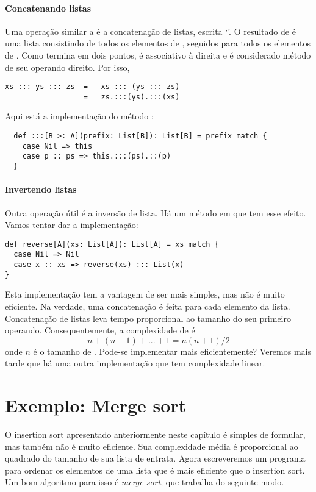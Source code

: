 \paragraph{Concatenando listas}
Uma operação similar a \code{::} é a concatenação de listas, escrita `\code{:::}'.
O resultado de  é uma lista consistindo de todos os elementos 
de , seguidos para todos os elementos de . Como termina em dois pontos, 
\code{:::} é associativo à direita e é considerado método de seu operando direito. Por isso,
\begin{lstlisting}
xs ::: ys ::: zs  =   xs ::: (ys ::: zs)
                  =   zs.:::(ys).:::(xs)
\end{lstlisting}
Aqui está a implementação do método \code{:::}:
\begin{lstlisting}
  def :::[B >: A](prefix: List[B]): List[B] = prefix match {
    case Nil => this
    case p :: ps => this.:::(ps).::(p)
  }
\end{lstlisting}

\paragraph{Invertendo listas} 
Outra operação útil é a inversão de lista. Há um método  em 
que tem esse efeito. Vamos tentar dar a implementação:
\begin{lstlisting}
def reverse[A](xs: List[A]): List[A] = xs match {
  case Nil => Nil
  case x :: xs => reverse(xs) ::: List(x)
}
\end{lstlisting}
Esta implementação tem a vantagem de ser mais simples, mas não é muito eficiente. 
Na verdade, uma concatenação é feita para cada elemento da lista. Concatenação de listas
leva tempo proporcional ao tamanho do seu primeiro operando. Consequentemente, a complexidade
de  é 
\[
n + (n - 1) + ... + 1 = n(n+1)/2
\]
onde $n$ é o tamanho de . Pode-se implementar  mais eficientemente? 
Veremos mais tarde que há uma outra implementação que tem complexidade linear.

\section{Exemplo: Merge sort}

O insertion sort apresentado anteriormente neste capítulo é simples de formular, mas também não 
é muito eficiente. Sua complexidade média é proporcional ao quadrado do tamanho de sua lista 
de entrata. Agora escreveremos um programa para ordenar os elementos de uma lista que é mais 
eficiente que o insertion sort. Um bom algoritmo para isso é {\em merge sort}, que trabalha 
do seguinte modo.


